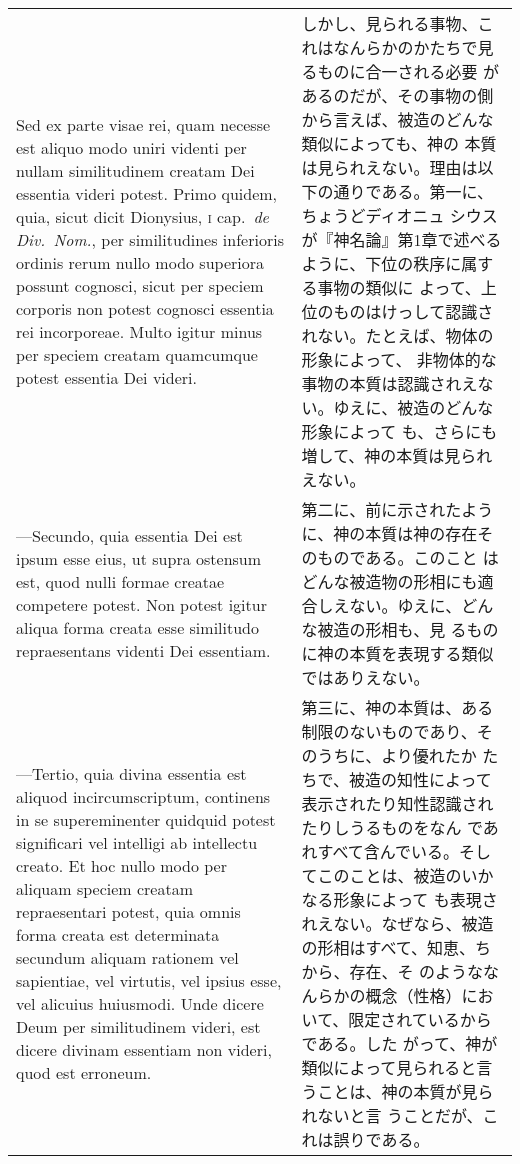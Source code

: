 \documentclass[10pt]{jsarticle} %
\begin{document}
\begin{longtable}{p{21em}p{21em}}
\\

Sed ex parte visae rei, quam necesse est aliquo modo uniri videnti per
nullam similitudinem creatam Dei essentia videri potest. Primo quidem,
quia, sicut dicit Dionysius, {\scshape i} cap.\ {\itshape de Div.\
Nom.}, per similitudines inferioris ordinis rerum nullo modo superiora
possunt cognosci, sicut per speciem corporis non potest cognosci
essentia rei incorporeae. Multo igitur minus per speciem creatam
quamcumque potest essentia Dei videri.

&

しかし、見られる事物、これはなんらかのかたちで見るものに合一される必要
があるのだが、その事物の側から言えば、被造のどんな類似によっても、神の
本質は見られえない。理由は以下の通りである。第一に、ちょうどディオニュ
シウスが『神名論』第1章で述べるように、下位の秩序に属する事物の類似に
よって、上位のものはけっして認識されない。たとえば、物体の形象によって、
非物体的な事物の本質は認識されえない。ゆえに、被造のどんな形象によって
も、さらにも増して、神の本質は見られえない。

\\

---Secundo, quia essentia Dei est ipsum esse eius, ut supra ostensum
est, quod nulli formae creatae competere potest. Non potest igitur
aliqua forma creata esse similitudo repraesentans videnti Dei
essentiam.

&

第二に、前に示されたように、神の本質は神の存在そのものである。このこと
はどんな被造物の形相にも適合しえない。ゆえに、どんな被造の形相も、見
るものに神の本質を表現する類似ではありえない。

\\

---Tertio, quia divina essentia est aliquod incircumscriptum,
continens in se supereminenter quidquid potest significari vel
intelligi ab intellectu creato. Et hoc nullo modo per aliquam speciem
creatam repraesentari potest, quia omnis forma creata est determinata
secundum aliquam rationem vel sapientiae, vel virtutis, vel ipsius
esse, vel alicuius huiusmodi. Unde dicere Deum per similitudinem
videri, est dicere divinam essentiam non videri, quod est erroneum.

&

第三に、神の本質は、ある制限のないものであり、そのうちに、より優れたか
たちで、被造の知性によって表示されたり知性認識されたりしうるものをなん
であれすべて含んでいる。そしてこのことは、被造のいかなる形象によって
も表現されえない。なぜなら、被造の形相はすべて、知恵、ちから、存在、そ
のようななんらかの概念（性格）において、限定されているからである。した
がって、神が類似によって見られると言うことは、神の本質が見られないと言
うことだが、これは誤りである。


\end{longtable}
\end{document}
